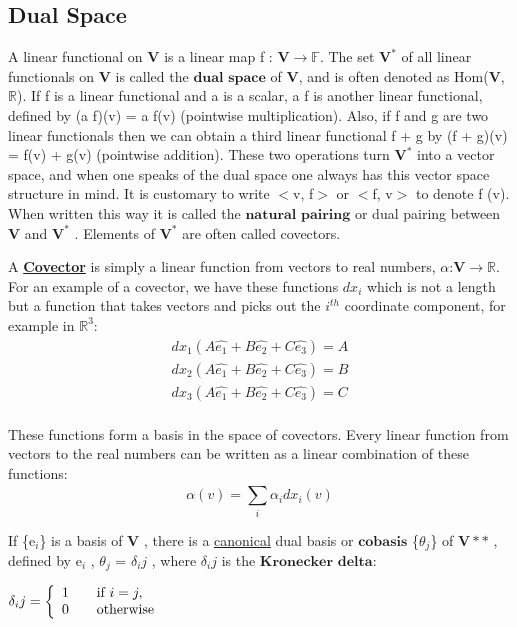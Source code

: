 \subsection{Dual Space}
A linear functional on $\textbf{V}$ is a linear map f : $\textbf{V} \rightarrow \mathbb{F}$. The set $\textbf{V} ^\ast$  of all linear
functionals on $\textbf{V}$ is called the $\textbf{dual space}$ of $\textbf{V}$, and is often denoted as Hom($\textbf{V}$, $\mathbb{R}$).
If f is a linear functional and a is a scalar, a f is another linear functional, defined
by (a f)(v) = a f(v) (pointwise multiplication). Also, if f and g are two linear
functionals then we can obtain a third linear functional f + g by (f + g)(v) =
f(v) + g(v) (pointwise addition). These two operations turn $\textbf{V}^ \ast
$  into a vector space, and when one speaks of the dual space one always has 
this vector space structure in mind.
It is customary to write $<$v, f$>$  or  $<$f, v$>$ to denote f (v). When written this way
it is called the $\textbf{natural pairing}$ or dual pairing between $\textbf{V}$ and $\textbf{V}^ \ast$ .
Elements of $\textbf{V}^ \ast$ are often called covectors.

A \href{https://math.stackexchange.com/questions/240491/what-is-a-covector-and-what-is-it-used-for}{\textbf{Covector}} 
is simply a linear function from vectors to real numbers, $\alpha$:$\textbf{V} \rightarrow \mathbb{R}$. 
For an example of a covector, we have these functions $dx_i$ which
is not a length but a function that takes vectors and picks out the $i^{th}$
coordinate component, for example in $\mathbb{R}^3$:
\begin{equation}
    \begin{aligned}
        dx_1 (A\hat{e_1} + B\hat{e_2} + C\hat{e_3}) = A \\
        dx_2 (A\hat{e_1} + B\hat{e_2} + C\hat{e_3}) = B \\
        dx_3 (A\hat{e_1} + B\hat{e_2} + C\hat{e_3}) = C  \\
    \end{aligned}
\end{equation}

These functions form a basis in the space of covectors. 
Every linear function from vectors to the real numbers can be written as a linear combination of these functions:
\begin{equation}
    \alpha (v) = \sum_{i}^{} \alpha_i dx_i(v)
\end{equation}

If \{e$_i$\} is a basis of $\textbf{V}$ , there is a \href{https://math.stackexchange.com/questions/490342/what-is-meant-by-canonical}{canonical} dual basis or $\textbf{cobasis}$ \{$\theta_j$\} of $\textbf{V}*\ast$ ,
defined by e$_i$ , $\theta_j$ = $\delta_ij$ , where $\delta_ij$ is the $\textbf{Kronecker delta}$:
\begin{center}
    $\delta_ij = \left\{ 
  \begin{array}{ c l }
    1 & \quad \textrm{if } i=j, \\
    0 & \quad \textrm{otherwise} \\
  \end{array}
    \right.$ 
\end{center}

